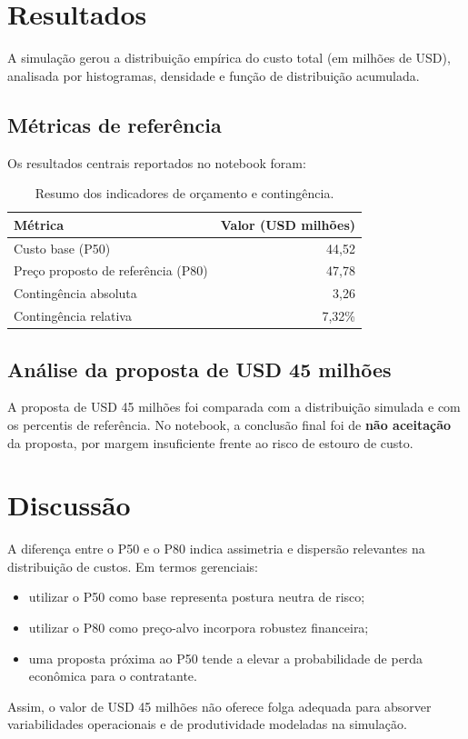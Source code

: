 \documentclass[12pt,a4paper]{article}
\begin{document}
\section{Resultados}
A simula\c{c}\~ao gerou a distribui\c{c}\~ao emp\'irica do custo total (em milh\~oes de USD), analisada por histogramas, densidade e fun\c{c}\~ao de distribui\c{c}\~ao acumulada.

\subsection{M\'etricas de refer\^encia}
Os resultados centrais reportados no notebook foram:

\begin{table}[h!]
\centering
\begin{tabular}{lr}
\toprule
M\'etrica & Valor (USD milh\~oes) \\
\midrule
Custo base (P50) & 44,52 \\
Pre\c{c}o proposto de refer\^encia (P80) & 47,78 \\
Conting\^encia absoluta & 3,26 \\
Conting\^encia relativa & 7,32\% \\
\bottomrule
\end{tabular}
\caption{Resumo dos indicadores de or\c{c}amento e conting\^encia.}
\end{table}

\subsection{An\'alise da proposta de USD 45 milh\~oes}
A proposta de USD 45 milh\~oes foi comparada com a distribui\c{c}\~ao simulada e com os percentis de refer\^encia. No notebook, a conclus\~ao final foi de \textbf{n\~ao aceita\c{c}\~ao} da proposta, por margem insuficiente frente ao risco de estouro de custo.

\section{Discuss\~ao}
A diferen\c{c}a entre o P50 e o P80 indica assimetria e dispers\~ao relevantes na distribui\c{c}\~ao de custos. Em termos gerenciais:
\begin{itemize}
  \item utilizar o P50 como base representa postura neutra de risco;
  \item utilizar o P80 como pre\c{c}o-alvo incorpora robustez financeira;
  \item uma proposta pr\'oxima ao P50 tende a elevar a probabilidade de perda econ\^omica para o contratante.
\end{itemize}
Assim, o valor de USD 45 milh\~oes n\~ao oferece folga adequada para absorver variabilidades operacionais e de produtividade modeladas na simula\c{c}\~ao.
\end{document}
